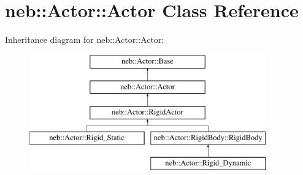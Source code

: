 \hypertarget{classneb_1_1Actor_1_1Actor}{\section{neb\-:\-:\-Actor\-:\-:\-Actor \-Class \-Reference}
\label{classneb_1_1Actor_1_1Actor}
}
\-Inheritance diagram for neb\-:\-:\-Actor\-:\-:\-Actor\-:\begin{figure}[H]
\begin{center}
\leavevmode
\includegraphics[height=5.000000cm]{classneb_1_1Actor_1_1Actor}
\end{center}
\end{figure}
